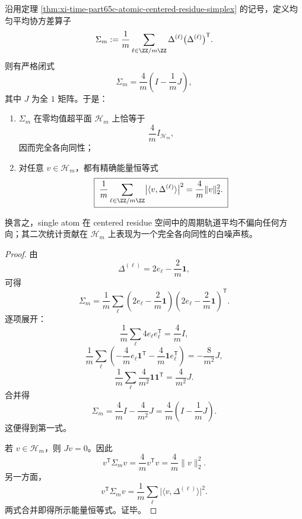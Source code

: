 \begin{corollary}\label{cor:xi-time-part65c-atomic-centered-residue-isotropic}
沿用定理 \ref{thm:xi-time-part65c-atomic-centered-residue-simplex} 的记号，定义均匀平均协方差算子
\[
\Sigma_m:=
\frac{1}{m}\sum_{\ell\in\ZZ/m\ZZ}
\Delta^{(\ell)}\bigl(\Delta^{(\ell)}\bigr)^{\mathsf T}.
\]
则有严格闭式
\[
\boxed{\;
\Sigma_m=\frac{4}{m}\left(I-\frac{1}{m}J\right),\;}
\]
其中 \(J\) 为全 \(1\) 矩阵。于是：
\begin{enumerate}
  \item \(\Sigma_m\) 在零均值超平面 \(\mathcal H_m\) 上恰等于
  \[
  \frac{4}{m}I_{\mathcal H_m},
  \]
  因而完全各向同性；
  \item 对任意 \(v\in\mathcal H_m\)，都有精确能量恒等式
  \[
  \boxed{\;
  \frac{1}{m}\sum_{\ell\in\ZZ/m\ZZ}
  \bigl|\langle v,\Delta^{(\ell)}\rangle\bigr|^2
  =
  \frac{4}{m}\|v\|_2^2.\;}
  \]
\end{enumerate}
换言之，single atom 在 centered residue 空间中的周期轨道平均不偏向任何方向；其二次统计贡献在 \(\mathcal H_m\) 上表现为一个完全各向同性的白噪声核。
\end{corollary}
\begin{proof}
由
\[
\Delta^{(\ell)}=2e_\ell-\frac{2}{m}\mathbf 1,
\]
可得
\[
\Sigma_m
=
\frac{1}{m}\sum_{\ell}
\left(2e_\ell-\frac{2}{m}\mathbf 1\right)
\left(2e_\ell-\frac{2}{m}\mathbf 1\right)^{\mathsf T}.
\]
逐项展开：
\[
\frac{1}{m}\sum_{\ell}4e_\ell e_\ell^{\mathsf T}=\frac{4}{m}I,
\]
\[
\frac{1}{m}\sum_{\ell}\left(
-\frac{4}{m}e_\ell\mathbf 1^{\mathsf T}
-\frac{4}{m}\mathbf 1 e_\ell^{\mathsf T}
\right)
=
-\frac{8}{m^2}J,
\]
\[
\frac{1}{m}\sum_{\ell}\frac{4}{m^2}\mathbf 1\mathbf 1^{\mathsf T}
=
\frac{4}{m^2}J.
\]
合并得
\[
\Sigma_m=\frac{4}{m}I-\frac{4}{m^2}J
=
\frac{4}{m}\left(I-\frac{1}{m}J\right).
\]
这便得到第一式。

若 \(v\in\mathcal H_m\)，则 \(Jv=0\)。因此
\[
v^{\mathsf T}\Sigma_m v
=
\frac{4}{m}v^{\mathsf T}v
=
\frac{4}{m}\|v\|_2^2.
\]
另一方面，
\[
v^{\mathsf T}\Sigma_m v
=
\frac{1}{m}\sum_{\ell}
\bigl|\langle v,\Delta^{(\ell)}\rangle\bigr|^2.
\]
两式合并即得所示能量恒等式。证毕。
\end{proof}

